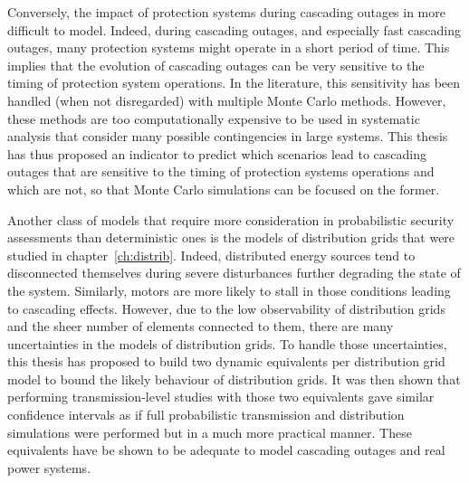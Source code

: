 Conversely, the impact of protection systems during cascading outages in more difficult to model. Indeed, during cascading outages, and especially fast cascading outages, many protection systems might operate in a short period of time. This implies that the evolution of cascading outages can be very sensitive to the timing of protection system operations. In the literature, this sensitivity has been handled (when not disregarded) with multiple Monte Carlo methods. However, these methods are too computationally expensive to be used in systematic analysis that consider many possible contingencies in large systems. This thesis has thus proposed an indicator to predict which scenarios lead to cascading outages that are sensitive to the timing of protection systems operations and which are not, so that Monte Carlo simulations can be focused on the former.

Another class of models that require more consideration in probabilistic security assessments than deterministic ones is the models of distribution grids that were studied in chapter~\ref{ch:distrib}. Indeed, distributed energy sources tend to disconnected themselves during severe disturbances further degrading the state of the system. Similarly, motors are more likely to stall in those conditions leading to cascading effects. However, due to the low observability of distribution grids and the sheer number of elements connected to them, there are many uncertainties in the models of distribution grids. To handle those uncertainties, this thesis has proposed to build two dynamic equivalents per distribution grid model to bound the likely behaviour of distribution grids. It was then shown that performing transmission-level studies with those two equivalents gave similar confidence intervals as if full probabilistic transmission and distribution simulations were performed but in a much more practical manner. These equivalents have be shown to be adequate to model cascading outages and real power systems.

